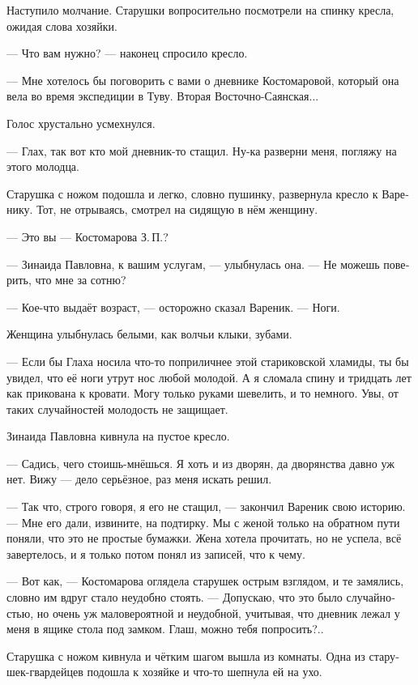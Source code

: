 \documentclass[a5paper,12pt,fleqn]{extbook}\usepackage{cooltooltips}\usepackage{polyglossia}\setdefaultlanguage[babelshorthands=true]{russian}\setotherlanguage{english}\defaultfontfeatures{Ligatures=TeX,Mapping=tex-text} \usepackage{xcolor}\definecolor{lightgray}{HTML}{bbbbbb}\color{lightgray}\newcommand{\ml}[3]{\textenglish{\textcolor{black}{#3}}}
\newcommand{\asterism}{\vspace{1em}{\centering\Large\bfseries$\ast~\ast~\ast$\par}\vspace{1em}}
\begin{document}
Наступило молчание.
Старушки вопросительно посмотрели на спинку кресла, ожидая слова хозяйки.

--- Что вам нужно? --- наконец спросило кресло.

--- Мне хотелось бы поговорить с вами о дневнике Костомаровой, который она вела во время экспедиции в Туву.
Вторая Восточно-Саянская...

Голос хрустально усмехнулся.

--- Глах, так вот кто мой дневник-то стащил.
Ну-ка разверни меня, погляжу на этого молодца.

Старушка с ножом подошла и легко, словно пушинку, развернула кресло к Варенику.
Тот, не отрываясь, смотрел на сидящую в нём женщину.

--- Это вы --- Костомарова З.\,П.?

--- Зинаида Павловна, к вашим услугам, --- улыбнулась она.
--- Не можешь поверить, что мне за сотню?

--- Кое-что выдаёт возраст, --- осторожно сказал Вареник.
--- Ноги.

Женщина улыбнулась белыми, как волчьи клыки, зубами.

--- Если бы Глаха носила что-то поприличнее этой стариковской хламиды, ты бы увидел, что её ноги утрут нос любой молодой.
А я сломала спину и тридцать лет как прикована к кровати.
Могу только руками шевелить, и то немного.
Увы, от таких случайностей молодость не защищает.

Зинаида Павловна кивнула на пустое кресло.

--- Садись, чего стоишь-мнёшься.
Я хоть и из дворян, да дворянства давно уж нет.
Вижу --- дело серьёзное, раз меня искать решил.

\asterism

--- Так что, строго говоря, я его не стащил, --- закончил Вареник свою историю.
--- Мне его дали, извините, на подтирку.
Мы с женой только на обратном пути поняли, что это не простые бумажки.
Жена хотела прочитать, но не успела, всё завертелось, и я только потом понял из записей, что к чему.

--- Вот как, --- Костомарова оглядела старушек острым взглядом, и те замялись, словно им вдруг стало неудобно стоять.
--- Допускаю, что это было случайностью, но очень уж маловероятной и неудобной, учитывая, что дневник лежал у меня в ящике стола под замком.
Глаш, можно тебя попросить?..

Старушка с ножом кивнула и чётким шагом вышла из комнаты.
Одна из старушек-гвардейцев подошла к хозяйке и что-то шепнула ей на ухо.
\end{document}
